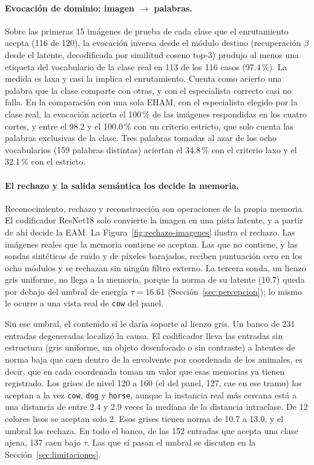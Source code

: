 \paragraph{Evocación de dominio: imagen $\to$ palabras.}
Sobre las primeras 15 imágenes de prueba de cada clase que el enrutamiento acepta (116 de
120), la evocación inversa desde el módulo destino (recuperación $\beta$ desde el
latente, decodificada por similitud coseno top-3) produjo al menos una etiqueta del
vocabulario de la clase real en 113 de los 116 casos (97.4\,\%).
La medida es laxa y casi la implica el enrutamiento.
Cuenta como acierto una palabra que la clase comparte con otras, y con el especialista
correcto casi no falla.
En la comparación con una sola EHAM, con el especialista elegido por la clase real, la
evocación acierta el 100\,\% de las imágenes respondidas en los cuatro cortes, y entre
el 98.2 y el 100.0\,\% con un criterio estricto, que solo cuenta las palabras exclusivas
de la clase.
Tres palabras tomadas al azar de los ocho vocabularios (159 palabras distintas) aciertan
el 34.8\,\% con el criterio laxo y el 32.1\,\% con el estricto.

\paragraph{El rechazo y la salida semántica los decide la memoria.}
Reconocimiento, rechazo y reconstrucción son operaciones de la propia memoria.
El codificador ResNet18 solo convierte la imagen en una pista latente, y a partir de ahí
decide la EAM.
La Figura~\ref{fig:rechazo-imagenes} ilustra el rechazo.
Las imágenes reales que la memoria contiene se aceptan.
Las que no contiene, y las sondas sintéticas de ruido y de píxeles barajados, reciben
puntuación cero en los ocho módulos y se rechazan sin ningún filtro externo.
La tercera sonda, un lienzo gris uniforme, no llega a la memoria, porque la norma de su
latente (10.7) queda por debajo del umbral de energía $\tau = 16.61$
(Sección~\ref{sec:percepcion}); lo mismo le ocurre a una vista real de \texttt{cow} del
panel.

Sin ese umbral, el contenido sí le daría soporte al lienzo gris.
Un banco de 231 entradas degeneradas localizó la causa.
El codificador lleva las entradas sin estructura (gris uniforme, un objeto desenfocado o
sin contraste) a latentes de norma baja que caen dentro de la envolvente por coordenada
de los animales, es decir, que en cada coordenada toman un valor que esas memorias ya
tienen registrado.
Los grises de nivel 120 a 160 (el del panel, 127, cae en ese tramo) los aceptan a la vez
\texttt{cow}, \texttt{dog} y \texttt{horse}, aunque la instancia real más cercana está a
una distancia de entre 2.4 y 2.9 veces la mediana de la distancia intraclase.
De 12 colores lisos se aceptan solo 2.
Esos grises tienen norma de 10.7 a 13.0, y el umbral los rechaza.
En todo el banco, de las 152 entradas que acepta una clase ajena, 137 caen bajo $\tau$.
Las que sí pasan el umbral se discuten en la Sección~\ref{sec:limitaciones}.

